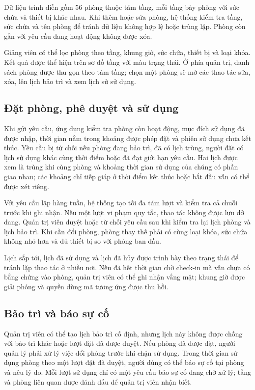 Dữ liệu trình diễn gồm 56 phòng thuộc tám tầng, mỗi tầng bảy phòng với sức chứa và thiết bị khác nhau. Khi thêm hoặc sửa phòng, hệ thống kiểm tra tầng, sức chứa và tên phòng để tránh dữ liệu không hợp lệ hoặc trùng lặp. Phòng còn gắn với yêu cầu đang hoạt động không được xóa.

Giảng viên có thể lọc phòng theo tầng, khung giờ, sức chứa, thiết bị và loại khóa. Kết quả được thể hiện trên sơ đồ tầng với màu trạng thái. Ở phía quản trị, danh sách phòng được thu gọn theo tám tầng; chọn một phòng sẽ mở các thao tác sửa, xóa, lên lịch bảo trì và xem lịch sử sử dụng.

\subsection{Đặt phòng, phê duyệt và sử dụng}

Khi gửi yêu cầu, ứng dụng kiểm tra phòng còn hoạt động, mục đích sử dụng đã được nhập, thời gian nằm trong khoảng được phép đặt và phiên sử dụng chưa kết thúc. Yêu cầu bị từ chối nếu phòng đang bảo trì, đã có lịch trùng, người đặt có lịch sử dụng khác cùng thời điểm hoặc đã đạt giới hạn yêu cầu. Hai lịch được xem là trùng khi cùng phòng và khoảng thời gian sử dụng của chúng có phần giao nhau; các khoảng chỉ tiếp giáp ở thời điểm kết thúc hoặc bắt đầu vẫn có thể được xét riêng.

Với yêu cầu lặp hàng tuần, hệ thống tạo tối đa tám lượt và kiểm tra cả chuỗi trước khi ghi nhận. Nếu một lượt vi phạm quy tắc, thao tác không được lưu dở dang. Quản trị viên duyệt hoặc từ chối yêu cầu sau khi kiểm tra lại lịch phòng và lịch bảo trì. Khi cần đổi phòng, phòng thay thế phải có cùng loại khóa, sức chứa không nhỏ hơn và đủ thiết bị so với phòng ban đầu.

Lịch sắp tới, lịch đã sử dụng và lịch đã hủy được trình bày theo trạng thái để tránh lặp thao tác ở nhiều nơi. Nếu đã hết thời gian chờ check-in mà vẫn chưa có bằng chứng vào phòng, quản trị viên có thể ghi nhận vắng mặt; khung giờ được giải phóng và quyền dùng mã tương ứng được thu hồi.

\subsection{Bảo trì và báo sự cố}

Quản trị viên có thể tạo lịch bảo trì cố định, nhưng lịch này không được chồng với bảo trì khác hoặc lượt đặt đã được duyệt. Nếu phòng đã được đặt, người quản lý phải xử lý việc đổi phòng trước khi chặn sử dụng. Trong thời gian sử dụng phòng theo một lượt đặt đã duyệt, người dùng có thể báo sự cố tại phòng và nêu lý do. Mỗi lượt sử dụng chỉ có một yêu cầu báo sự cố đang chờ xử lý; tầng và phòng liên quan được đánh dấu để quản trị viên nhận biết.

